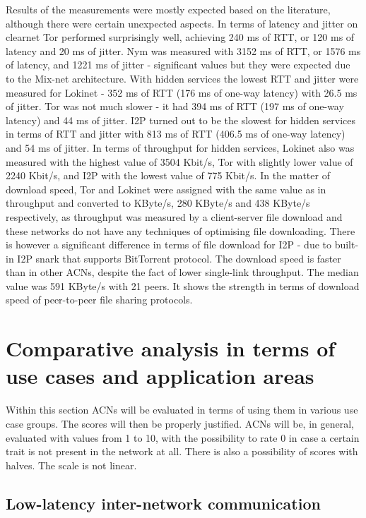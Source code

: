 Results of the measurements were mostly expected based on the literature, although there were certain unexpected aspects.
In terms of latency and jitter on clearnet Tor performed surprisingly well, achieving 240 ms of RTT, or 120 ms of latency and 20 ms of jitter. Nym was measured with 3152 ms of RTT, or 1576 ms of latency, and 1221 ms of jitter - significant values but they were expected due to the Mix-net architecture.
With hidden services the lowest RTT and jitter were measured for Lokinet - 352 ms of RTT (176 ms of one-way latency) with 26.5 ms of jitter. Tor was not much slower - it had 394 ms of RTT (197 ms of one-way latency) and 44 ms of jitter. I2P turned out to be the slowest for hidden services in terms of RTT and jitter with 813 ms of RTT (406.5 ms of one-way latency) and 54 ms of jitter. In terms of throughput for hidden services, Lokinet also was measured with the highest value of 3504 Kbit/s, Tor with slightly lower value of 2240 Kbit/s, and I2P with the lowest value of 775 Kbit/s. In the matter of download speed, Tor and Lokinet were assigned with the same value as in throughput and converted to KByte/s, 280 KByte/s and 438 KByte/s respectively, as throughput was measured by a client-server file download and these networks do not have any techniques of optimising file downloading. There is however a significant difference in terms of file download for I2P - due to built-in I2P snark that supports BitTorrent protocol. The download speed is faster than in other ACNs, despite the fact of lower single-link throughput. The median value was 591 KByte/s with 21 peers. It shows the strength in terms of download speed of peer-to-peer file sharing protocols.


\section{Comparative analysis in terms of use cases and application areas}

Within this section ACNs will be evaluated in terms of using them in various use case groups. The scores will then be properly justified. ACNs will be, in general, evaluated with values from 1 to 10, with the possibility to rate 0 in case a certain trait is not present in the network at all. There is also a possibility of scores with halves. The scale is not linear.

\subsection{Low-latency inter-network communication}

